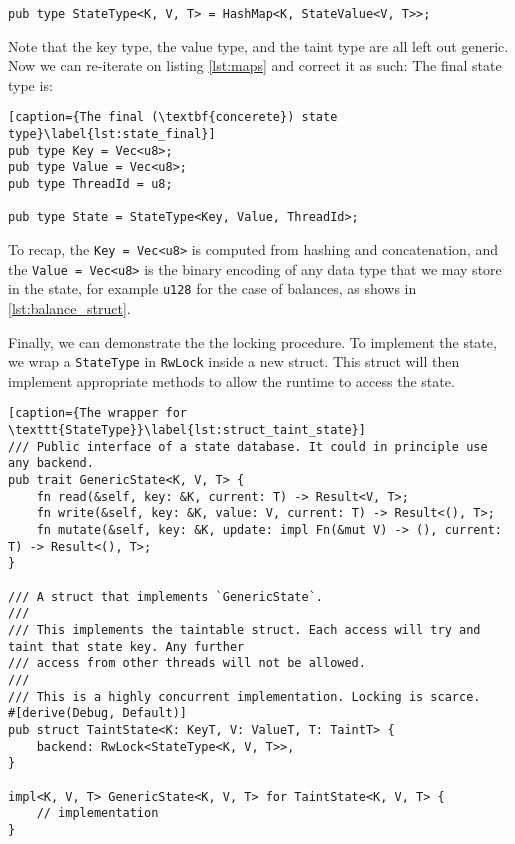 \begin{lstlisting}[caption={The final \textbf{(generic}) state type}]
pub type StateType<K, V, T> = HashMap<K, StateValue<V, T>>;
\end{lstlisting}

Note that the key type, the value type, and the taint type are all left out generic. Now we can
re-iterate on listing \ref{lst:maps} and correct it as such: The final state type is:

\begin{lstlisting}[caption={The final (\textbf{concerete}) state type}\label{lst:state_final}]
pub type Key = Vec<u8>;
pub type Value = Vec<u8>;
pub type ThreadId = u8;

pub type State = StateType<Key, Value, ThreadId>;
\end{lstlisting}

To recap, the \texttt{Key = Vec<u8>} is computed from hashing and concatenation, and the
\texttt{Value = Vec<u8>} is the binary encoding of any data type that we may store in the state, for
example \texttt{u128} for the case of balances, as shows in \ref{lst:balance_struct}.

Finally, we can demonstrate the the locking procedure. To implement the state, we wrap a
\texttt{StateType} in \texttt{RwLock} inside a new struct. This struct will then implement
appropriate methods to allow the runtime to access the state.

\begin{lstlisting}[caption={The wrapper for \texttt{StateType}}\label{lst:struct_taint_state}]
/// Public interface of a state database. It could in principle use any backend.
pub trait GenericState<K, V, T> {
	fn read(&self, key: &K, current: T) -> Result<V, T>;
	fn write(&self, key: &K, value: V, current: T) -> Result<(), T>;
	fn mutate(&self, key: &K, update: impl Fn(&mut V) -> (), current: T) -> Result<(), T>;
}

/// A struct that implements `GenericState`.
///
/// This implements the taintable struct. Each access will try and taint that state key. Any further
/// access from other threads will not be allowed.
///
/// This is a highly concurrent implementation. Locking is scarce.
#[derive(Debug, Default)]
pub struct TaintState<K: KeyT, V: ValueT, T: TaintT> {
	backend: RwLock<StateType<K, V, T>>,
}

impl<K, V, T> GenericState<K, V, T> for TaintState<K, V, T> {
	// implementation
}
\end{lstlisting}

